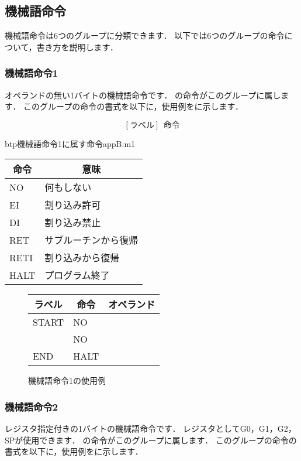 \subsection{機械語命令}
機械語命令は6つのグループに分類できます．
以下では6つのグループの命令について，書き方を説明します．

\subsubsection{機械語命令1}
オペランドの無い1バイトの機械語命令です．
の命令がこのグループに属します．
このグループの命令の書式を以下に，使用例をに示します．

{\small\[ %
[ラベル]~~命令 \]}

\begin{mytable}{btp}{機械語命令1に属す命令}{appB:m1}
{\small\begin{tabular}{l|l}
\hline\hline
\multicolumn{1}{c|}{命令} & \multicolumn{1}{c}{意味} \\\hline
NO & 何もしない \\
EI & 割り込み許可 \\
DI & 割り込み禁止 \\
RET & サブルーチンから復帰 \\
RETI & 割り込みから復帰 \\
HALT & プログラム終了
\end{tabular}}
\end{mytable}

\begin{figure}[btp]
\begin{center}
{\tt\small\begin{tabular}{|l|l|l|}
\hline
\multicolumn{1}{|c|}{ラベル} & 
        \multicolumn{1}{c|}{命令} & \multicolumn{1}{c|}{オペランド} \\\hline
START & NO   &  \\
      & NO   &  \\
END   & HALT &  \\\hline
\end{tabular}}
\caption{機械語命令1の使用例}
\label{fig:appB:m1ex}
\end{center}
\end{figure}

\subsubsection{機械語命令2}
レジスタ指定付きの1バイトの機械語命令です．
レジスタとしてG0，G1，G2，SPが使用できます．
の命令がこのグループに属します．
このグループの命令の書式を以下に，使用例をに示します．

